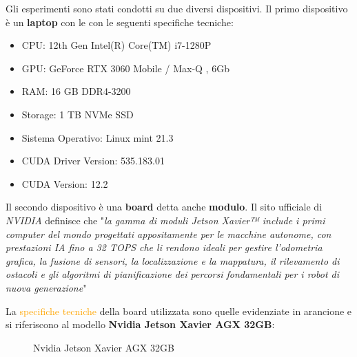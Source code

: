 \documentclass[12pt,a4paper]{report}
\begin{document}
Gli esperimenti sono stati condotti su due diversi dispositivi.
Il primo dispositivo è un \textbf{laptop} con le con le seguenti specifiche tecniche:

\begin{itemize}
    \item CPU: 12th Gen Intel(R) Core(TM) i7-1280P
    \item GPU: GeForce RTX 3060 Mobile / Max-Q , 6Gb
    \item RAM: 16 GB DDR4-3200
    \item Storage: 1 TB NVMe SSD
    \item Sistema Operativo: Linux mint 21.3
    \item CUDA Driver Version: 535.183.01  
    \item CUDA Version: 12.2
\end{itemize}

\vspace{1cm}

Il secondo dispositivo è una \textbf{board} detta anche \textbf{modulo}.
Il sito ufficiale di \textit{NVIDIA} definisce che "\textit{la gamma di moduli Jetson Xavier™ include i primi computer del mondo progettati appositamente per le macchine autonome, con prestazioni IA fino a 32 TOPS che li rendono ideali per gestire l'odometria grafica, la fusione di sensori, la localizzazione e la mappatura, il rilevamento di ostacoli e gli algoritmi di pianificazione dei percorsi fondamentali per i robot di nuova generazione}" \cite{board-series}

La \textcolor{orange}{specifiche tecniche} della board utilizzata sono quelle evidenziate in arancione e si riferiscono al modello \textbf{Nvidia Jetson Xavier AGX 32GB}:

\begin{figure}[H]
    \centering
    \caption{Nvidia Jetson Xavier AGX 32GB \cite{board-specific}}
\end{figure}
\end{document}
